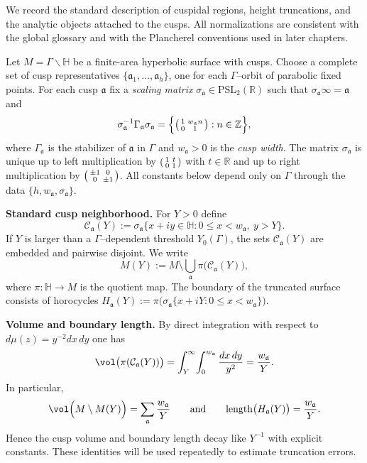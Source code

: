 
We record the standard description of cuspidal regions, height truncations,
and the analytic objects attached to the cusps.
All normalizations are consistent with the global glossary and with the
Plancherel conventions used in later chapters.

Let $M=\Gamma\backslash\mathbb{H}$ be a finite-area hyperbolic surface with cusps.
Choose a complete set of cusp representatives
$\{\mathfrak{a}_1,\dots,\mathfrak{a}_h\}$, one for each $\Gamma$–orbit of parabolic fixed points.
For each cusp $\mathfrak{a}$ fix a \emph{scaling matrix} $\sigma_{\mathfrak{a}}\in\mathrm{PSL}_2(\mathbb{R})$
such that $\sigma_{\mathfrak{a}}\infty=\mathfrak{a}$ and
\[
  \sigma_{\mathfrak{a}}^{-1}\Gamma_{\mathfrak{a}}\sigma_{\mathfrak{a}}
  =
  \Big\{ \begin{psmallmatrix}1&w_{\mathfrak{a}} n\\0&1\end{psmallmatrix} : n\in\mathbb{Z} \Big\},
\]
where $\Gamma_{\mathfrak{a}}$ is the stabilizer of $\mathfrak{a}$ in $\Gamma$ and
$w_{\mathfrak{a}}>0$ is the \emph{cusp width}.
The matrix $\sigma_{\mathfrak{a}}$ is unique up to left multiplication by
$\begin{psmallmatrix}1&t\\0&1\end{psmallmatrix}$ with $t\in\mathbb{R}$ and up to right multiplication by
$\begin{psmallmatrix}\pm1&0\\0&\pm1\end{psmallmatrix}$.
All constants below depend only on $\Gamma$ through the data
$\{h, w_{\mathfrak{a}}, \sigma_{\mathfrak{a}}\}$.

\medskip
\noindent\textbf{Standard cusp neighborhood.}
For $Y>0$ define
\[
  \mathcal{C}_{\mathfrak{a}}(Y)
  :=
  \sigma_{\mathfrak{a}}\big\{ x+iy \in \mathbb{H} : 0\le x < w_{\mathfrak{a}},\ y>Y \big\}.
\]
If $Y$ is larger than a $\Gamma$–dependent threshold $Y_0(\Gamma)$,
the sets $\mathcal{C}_{\mathfrak{a}}(Y)$ are embedded and pairwise disjoint.
We write
\[
  M(Y) := M \setminus \bigcup_{\mathfrak{a}} \pi\big(\mathcal{C}_{\mathfrak{a}}(Y)\big),
\]
where $\pi:\mathbb{H}\to M$ is the quotient map.
The boundary of the truncated surface consists of horocycles
$H_{\mathfrak{a}}(Y):=\pi\big(\sigma_{\mathfrak{a}}\{ x+iY : 0\le x < w_{\mathfrak{a}}\}\big)$.

\medskip
\noindent\textbf{Volume and boundary length.}
By direct integration with respect to $d\mu(z)=y^{-2}dx\,dy$ one has
\[
  \vol\big(\pi(\mathcal{C}_{\mathfrak{a}}(Y))\big)
  =
  \int_{Y}^{\infty}\!\int_{0}^{w_{\mathfrak{a}}} \frac{dx\,dy}{y^{2}}
  =
  \frac{w_{\mathfrak{a}}}{Y}.
\]
In particular,
\[
  \vol\Big(M \setminus M(Y)\Big)
  =
  \sum_{\mathfrak{a}} \frac{w_{\mathfrak{a}}}{Y}
  \qquad\text{and}\qquad
  \mathrm{length}\big(H_{\mathfrak{a}}(Y)\big)=\frac{w_{\mathfrak{a}}}{Y}.
\]
Hence the cusp volume and boundary length decay like $Y^{-1}$ with explicit constants.
These identities will be used repeatedly to estimate truncation errors.

